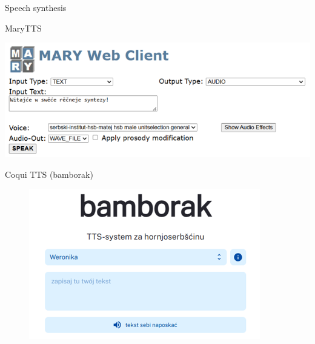   \begin{block}{Speech synthesis}


    MaryTTS

    \includegraphics[width=\colwidth]{06_z_01_marytts_small.png}


    Coqui TTS (bamborak\cite{bamborak})

    \begin{figure}
        \centering
        \includegraphics[width=0.75\colwidth]{06_z_02_bamborak_small.png}
        \label{fig:bamborak}
    \end{figure}
    

  \end{block}
